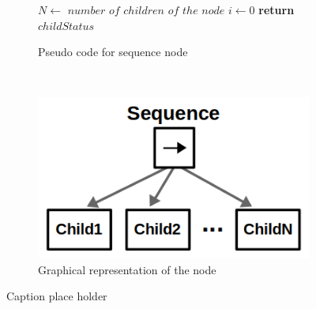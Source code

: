 \begin{figure}[H]
  \centering
  \begin{subfigure}[t]{0.6\textwidth}
      \begin{algorithm}[H]
        $N \gets $ $number$ $of$ $children$ $of$ $the$ $node$\;
        $i \gets 0$\;
        \textbf{return} $childStatus$
    \end{algorithm}
    
      \caption{Pseudo code for sequence node}\label{alg:seq}
  \end{subfigure}%
  ~ 
  \begin{subfigure}[t]{0.3\textwidth}
      \centering
      \includegraphics{figs/bt_sequence_node.png}
      \caption{Graphical representation of the node}
      \label{fig:seq}
  \end{subfigure}
  \caption{Caption place holder}
\end{figure}